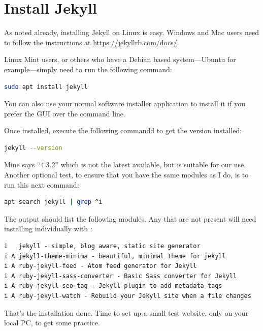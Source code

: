 \chapter{Install Jekyll}\label{chap: Install Jekyll}

As noted already, installing Jekyll on Linux is easy. Windows and Mac users need to follow the instructions at \url{https://jekyllrb.com/docs/}.

Linux Mint users, or others who have a Debian based system---Ubuntu for example---simply need to run the following command:

\begin{lstlisting}[style=myStyle,language=bash]
sudo apt install jekyll
\end{lstlisting}

You can also use your normal software installer application to install it if you prefer the GUI over the command line.

Once installed, execute the following commandd to get the version installed:

\begin{lstlisting}[style=myStyle,language=bash]
jekyll --version
\end{lstlisting}

Mine says ``4.3.2'' which is not the latest available, but is suitable for our use. Another optional test, to ensure that you have the same modules as I do, is to run this next command:

\begin{lstlisting}[style=myStyle,language=bash]
apt search jekyll | grep ^i
\end{lstlisting}

The output should list the following modules. Any that are not present will need installing individually with :

\begin{lstlisting}[style=myText]
i   jekyll - simple, blog aware, static site generator
i A jekyll-theme-minima - beautiful, minimal theme for jekyll
i A ruby-jekyll-feed - Atom feed generator for Jekyll
i A ruby-jekyll-sass-converter - Basic Sass converter for Jekyll
i A ruby-jekyll-seo-tag - Jekyll plugin to add metadata tags
i A ruby-jekyll-watch - Rebuild your Jekyll site when a file changes
\end{lstlisting}

That's the installation done. Time to set up a small test website, only on your local PC, to get some practice.

